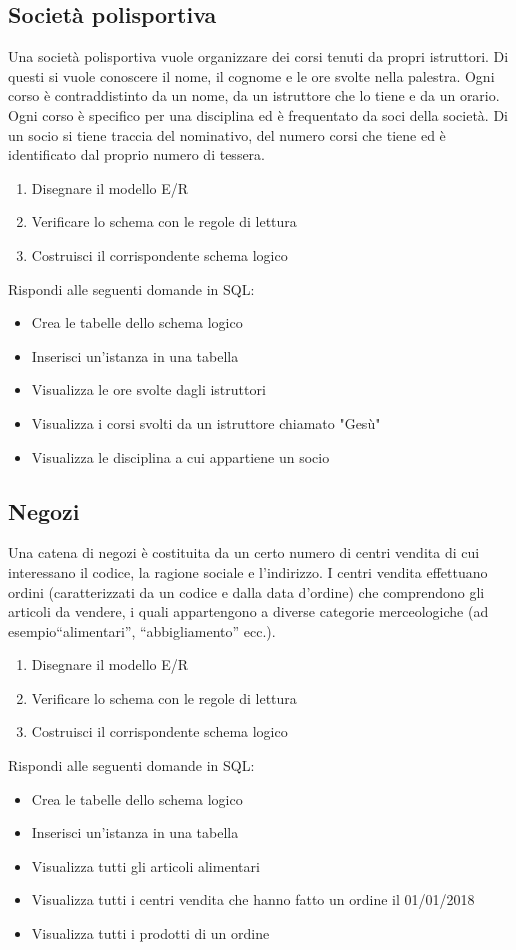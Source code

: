 \documentclass{article}
\begin{document}
	\subsection{Società polisportiva}
	Una società polisportiva vuole organizzare dei corsi tenuti da propri istruttori. Di questi si vuole conoscere il nome, il cognome e le ore svolte nella palestra. Ogni corso è contraddistinto da un nome, da un istruttore che lo tiene e da un orario. Ogni corso è specifico per una disciplina ed è frequentato da soci della società. Di un socio si tiene traccia del nominativo, del numero corsi che tiene ed è identificato dal proprio numero di tessera.
	\begin{enumerate}
		\item Disegnare il modello E/R
		\item Verificare lo schema con le regole di lettura
		\item Costruisci il corrispondente schema logico
	\end{enumerate}
	Rispondi alle seguenti domande in SQL:
	\begin{itemize}
		\item Crea le tabelle dello schema logico
		\item Inserisci un'istanza in una tabella
		\item Visualizza le ore svolte dagli istruttori
		\item Visualizza i corsi svolti da un istruttore chiamato "Gesù"
		\item Visualizza le disciplina a cui appartiene un socio
	\end{itemize}

	\subsection{Negozi}
	Una catena di negozi è costituita da un certo numero di centri vendita di cui interessano il codice, la ragione sociale e l’indirizzo. I centri vendita effettuano ordini (caratterizzati da un codice e dalla data d’ordine) che comprendono gli articoli da vendere, i quali appartengono a diverse categorie merceologiche (ad esempio“alimentari”, “abbigliamento” ecc.).
	\begin{enumerate}
		\item Disegnare il modello E/R
		\item Verificare lo schema con le regole di lettura
		\item Costruisci il corrispondente schema logico
	\end{enumerate}
	Rispondi alle seguenti domande in SQL:
	\begin{itemize}
		\item Crea le tabelle dello schema logico
		\item Inserisci un'istanza in una tabella
		\item Visualizza tutti gli articoli alimentari
		\item Visualizza tutti i centri vendita che hanno fatto un ordine il 01/01/2018
		\item Visualizza tutti i prodotti di un ordine
	\end{itemize}
\end{document}
